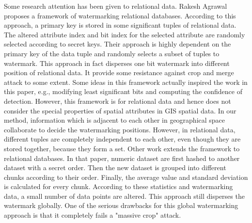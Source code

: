 Some research attention has been given to relational data\cite{AgrawalK02,SionAP03}. 
Rakesh Agrawal proposes a framework of watermarking relational databases\cite{AgrawalK02}. 
According to this approach, a primary key is stored in some significant 
tuples of relational data. The altered attribute index and bit 
index for the selected attribute are randomly 
selected according to secret keys. Their approach is highly dependent on the primary key 
of the data tuple and randomly selects a subset of tuples to watermark. This approach in 
fact disperses one bit watermark into different position of relational data. It provide 
some resistance against crop and merge attack to some extent. 
Some ideas in this framework actually inspired the work in this paper, e.g.,
modifying least significant bits and computing the confidence of detection.
However, this framework is for relational data and hence does not consider 
the special properties of spatial attributes in GIS spatial data. In our method,
information which is adjacent to each other in geographical space collaborate to
decide the watermarking positions. However, in relational data, different tuples
are completely independent to each other, even though they are stored together,
because they form a set.
Other work\cite{SionAP03} extends the framework\cite{SionAP02} 
to relational databases. In that paper, numeric dataset are first hashed 
to another dataset with a secret order.  Then the new dataset is grouped 
into different chunks according to their order. 
Finally, the average value and standard deviation is calculated for every chunk. 
According to these statistics and watermarking data, 
a small number of data points are altered. 
This approach still disperses the watermark globally. 
One of the serious drawbacks for this global watermarking approach is that 
it completely fails a "massive crop" attack.

